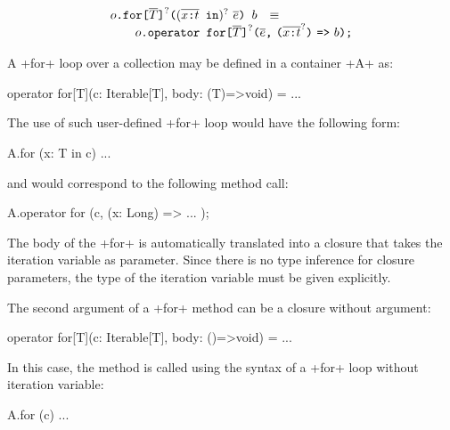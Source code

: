 
$$
\begin{array}{rcl}
  \usrFor{o}{\overline{T}}{\overline{\vardecl{x}{t}}}{\overline{e}}{b}
  & \equiv &
  \\
  \multicolumn{3}{r}{
  \qquad  \libFor{o}{\overline{T}}{\overline{\vardecl{x}{t}}}{\overline{e}}{b}
  }
\end{array}
$$

A \xcd+for+ loop over a collection may be defined in a container \xcd+A+ as:
\begin{xten}
operator for[T](c: Iterable[T], body: (T)=>void) = ...
\end{xten}
%
The use of such user-defined \xcd+for+ loop would have the following form:
\begin{xten}
A.for (x: T in c) { ... }
\end{xten}
and would correspond to the following method call:
\begin{xten}
A.operator for (c, (x: Long) => { ... });
\end{xten}
%
The body of the \xcd+for+ is automatically translated into a closure
that takes the iteration variable as parameter.
%
Since there is no type inference for closure parameters, the type of
the iteration variable must be given explicitly.

The second argument of a \xcd+for+ method can be a closure without argument:
\begin{xten}
operator for[T](c: Iterable[T], body: ()=>void) = ...
\end{xten}
In this case, the method is called using the syntax of a \xcd+for+ loop without iteration variable:
\begin{xten}
A.for (c) { ... }
\end{xten}

